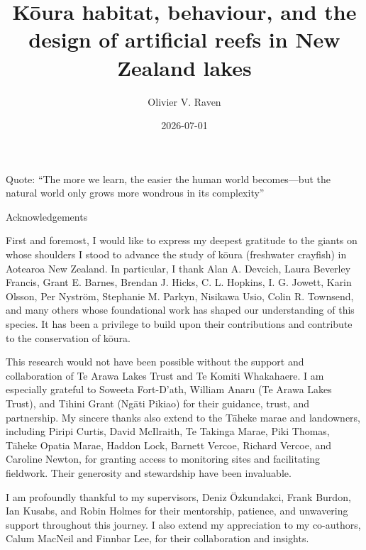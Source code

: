 \documentclass[
  12pt,
  a4paper,
]{scrbook}
\title{Kōura habitat, behaviour, and the design of artificial reefs in
New Zealand lakes}
\author{Olivier V. Raven}
\date{2026-07-01}
\renewcommand*\contentsname{Table of contents}
\newcommand\contentsname{Table of contents}
\begin{document}
\frontmatter
\maketitle

\renewcommand*\contentsname{Table of contents}
{
\setcounter{tocdepth}{2}
\tableofcontents
}

\mainmatter
{}

\chapter{}\label{section}


\chapter{}\label{section-1}

Quote: ``The more we learn, the easier the human world becomes---but the
natural world only grows more wondrous in its complexity''

Acknowledgements

First and foremost, I would like to express my deepest gratitude to the
giants on whose shoulders I stood to advance the study of kōura
(freshwater crayfish) in Aotearoa New Zealand. In particular, I thank
Alan A. Devcich, Laura Beverley Francis, Grant E. Barnes, Brendan J.
Hicks, C. L. Hopkins, I. G. Jowett, Karin Olsson, Per Nyström, Stephanie
M. Parkyn, Nisikawa Usio, Colin R. Townsend, and many others whose
foundational work has shaped our understanding of this species. It has
been a privilege to build upon their contributions and contribute to the
conservation of kōura.

This research would not have been possible without the support and
collaboration of Te Arawa Lakes Trust and Te Komiti Whakahaere. I am
especially grateful to Soweeta Fort-D'ath, William Anaru (Te Arawa Lakes
Trust), and Tihini Grant (Ngāti Pikiao) for their guidance, trust, and
partnership. My sincere thanks also extend to the Tāheke marae and
landowners, including Piripi Curtis, David McIlraith, Te Takinga Marae,
Piki Thomas, Tāheke Opatia Marae, Haddon Lock, Barnett Vercoe, Richard
Vercoe, and Caroline Newton, for granting access to monitoring sites and
facilitating fieldwork. Their generosity and stewardship have been
invaluable.

I am profoundly thankful to my supervisors, Deniz Özkundakci, Frank
Burdon, Ian Kusabs, and Robin Holmes for their mentorship, patience, and
unwavering support throughout this journey. I also extend my
appreciation to my co-authors, Calum MacNeil and Finnbar Lee, for their
collaboration and insights.
\end{document}
